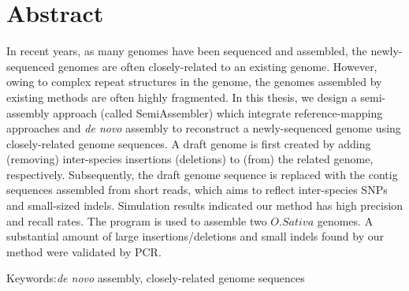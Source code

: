\chapter{Abstract}

In recent years, as many genomes have been sequenced and assembled, the newly-sequenced genomes are often closely-related to an existing genome. However, owing to complex repeat structures in the genome, the genomes assembled by existing methods are often highly fragmented. In this thesis, we design a semi-assembly approach (called SemiAssembler) which integrate reference-mapping approaches and {\em de novo} assembly to reconstruct a newly-sequenced genome using closely-related genome sequences. A draft genome is first created by adding (removing) inter-species insertions (deletions) to (from) the related genome, respectively. Subsequently, the draft genome sequence is replaced with the contig sequences assembled from short reads, which aims to reflect inter-species SNPs and small-sized indels. Simulation results indicated our method has high precision and recall rates. The program is used to assemble two $O. Sativa$ genomes. A substantial amount of large insertions/deletions and small indels found by our method were validated by PCR.

Keywords:{\em de novo} assembly, closely-related genome sequences